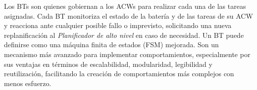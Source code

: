 \documentclass[fontsize=11pt, English=false, Español=true, Myfinal=true, twoside, numbers=noenddot]{scrbook}
\begin{document}
Los \glspl{BT} son quienes gobiernan a los \glspl{ACW} para realizar cada una de las tareas asignadas. Cada \gls{BT} monitoriza el estado de la batería y de las tareas de su \gls{ACW} y reacciona ante cualquier posible fallo o imprevisto, solicitando una nueva replanificación al \emph{Planificador de alto nivel} en caso de necesidad. Un \gls{BT} puede definirse como una máquina finita de estados (\gls{FSM}) mejorada. Son un mecanismo más avanzado para implementar comportamientos, especialmente por sus ventajas en términos de escalabilidad, modularidad, legibilidad y reutilización, facilitando la creación de comportamientos más complejos con menos esfuerzo.


\end{document}
